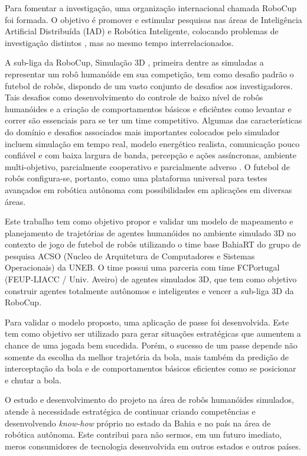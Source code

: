 Para fomentar a investigação, uma organização internacional chamada RoboCup \cite{robocup} foi formada. O objetivo é promover e estimular 
pesquisas nas áreas de Inteligência Artificial Distribuída (IAD) e Robótica Inteligente, colocando problemas de investigação distintos 
, mas ao mesmo tempo interrelacionados.

A sub-liga da RoboCup, Simulação 3D \cite{SimulationLeague}, primeira dentre as simuladas a representar um robô humanóide em sua 
competição, tem como desafio padrão o futebol de robôs, dispondo de um vasto conjunto de desafios aos investigadores. Tais desafios 
como  desenvolvimento do controle de baixo nível de robôs humanóides e a criação de comportamentos básicos e eficiêntes como levantar 
e correr são essenciais para se ter um time competitivo. Algumas das características do domínio e desafios associados mais 
importantes colocados pelo simulador incluem simulação em tempo real, modelo energético realista, comunicação pouco confiável e 
com baixa largura de banda, percepção e ações assíncronas, ambiente multi-objetivo, parcialmente cooperativo e parcialmente 
adverso \cite{bReis2001}. O futebol de robôs configura-se, portanto, como uma plataforma universal 
para testes avançados em robótica autônoma com possibilidades em aplicações em diversas áreas.

Este trabalho tem como objetivo propor e validar um modelo de mapeamento e planejamento de trajetórias de agentes humanóides no
ambiente simulado 3D no contexto de jogo de futebol de robôs utilizando o time base BahiaRT do grupo de pesquisa 
ACSO (Nucleo de Arquitetura de Computadores e Sistemas Operacionais) da UNEB. O time possui uma parceria com 
time FCPortugal (FEUP-LIACC / Univ. Aveiro) de agentes simulados 3D, que tem como objetivo construir agentes 
totalmente autônomos e inteligentes e vencer a sub-liga 3D da RoboCup.

Para validar o modelo proposto, uma aplicação de passe foi desenvolvida. Este tem como objetivo ser utilizado para gerar situações 
estratégicas que aumentem a chance de uma jogada bem sucedida. Porém, o sucesso de um passe depende não somente da escolha da melhor
trajetória da bola, mais também da predição de interceptação da bola e de comportamentos básicos eficientes como se posicionar e 
chutar a bola.

O estudo e desenvolvimento do projeto na área de robôs humanóides simulados, atende à necessidade estratégica
de continuar criando competências e desenvolvendo {\it know-how} próprio no estado da Bahia e no país na área de robótica autônoma. Este 
contribui para não sermos, em um futuro imediato, meros consumidores de tecnologia desenvolvida em outros estados e outros países.

